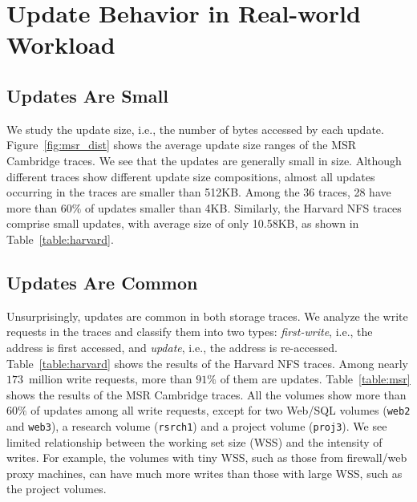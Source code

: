 \section{Update Behavior in Real-world Workload}


\subsection{Updates Are Small}  We study the update size, i.e., the number of
bytes accessed by each update.  Figure~\ref{fig:msr_dist} shows the average
update size ranges of the MSR Cambridge traces.  We see that the updates are
generally small in size. Although different traces show different
update size compositions, almost all updates occurring in the traces are smaller than
512KB. Among the 36 traces, 28 have more than $60\%$ of updates
smaller than 4KB. Similarly, the Harvard NFS traces comprise small updates,
with average size of only 10.58KB, as shown in Table~\ref{table:harvard}.

\subsection{Updates Are Common} Unsurprisingly, updates are common in both
storage traces.  We analyze the write requests in the traces and classify them
into two types: {\em first-write}, i.e., the address is first accessed, and
{\em update}, i.e., the address is re-accessed.  Table~\ref{table:harvard}
shows the results of the Harvard NFS traces.  Among nearly $173$~million
write requests, more than $91\%$ of them are updates.  Table~\ref{table:msr}
shows the results of the MSR Cambridge traces. All the volumes show more than
$60\%$ of updates among all write requests, except for two Web/SQL volumes
(\texttt{web2} and \texttt{web3}), a research volume (\texttt{rsrch1}) and a
project volume (\texttt{proj3}). We see limited relationship between 
the working set size (WSS) and the intensity of writes.  For example, the
volumes with tiny WSS, such as those from firewall/web proxy machines, can
have much more writes than those with large WSS, such as the project volumes.  


